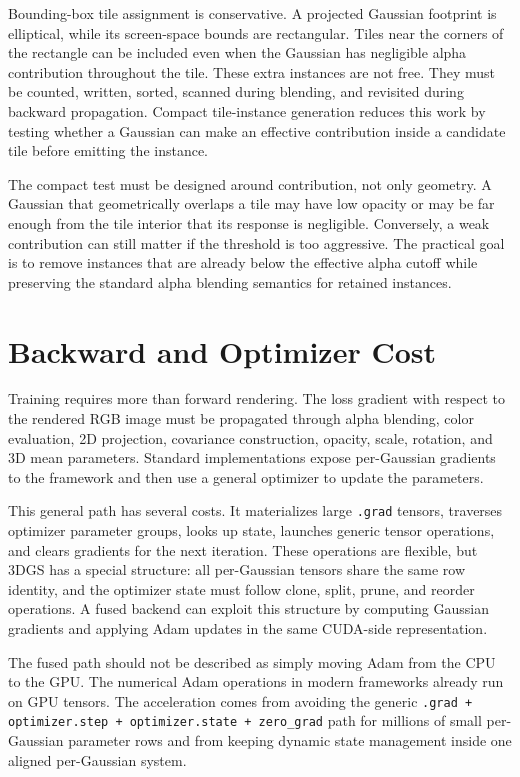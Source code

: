Bounding-box tile assignment is conservative. A projected Gaussian footprint is elliptical, while its screen-space bounds are rectangular. Tiles near the corners of the rectangle can be included even when the Gaussian has negligible alpha contribution throughout the tile. These extra instances are not free. They must be counted, written, sorted, scanned during blending, and revisited during backward propagation. Compact tile-instance generation reduces this work by testing whether a Gaussian can make an effective contribution inside a candidate tile before emitting the instance.

The compact test must be designed around contribution, not only geometry. A Gaussian that geometrically overlaps a tile may have low opacity or may be far enough from the tile interior that its response is negligible. Conversely, a weak contribution can still matter if the threshold is too aggressive. The practical goal is to remove instances that are already below the effective alpha cutoff while preserving the standard alpha blending semantics for retained instances.

\section{Backward and Optimizer Cost}

Training requires more than forward rendering. The loss gradient with respect to the rendered RGB image must be propagated through alpha blending, color evaluation, 2D projection, covariance construction, opacity, scale, rotation, and 3D mean parameters. Standard implementations expose per-Gaussian gradients to the framework and then use a general optimizer to update the parameters.

This general path has several costs. It materializes large \texttt{.grad} tensors, traverses optimizer parameter groups, looks up state, launches generic tensor operations, and clears gradients for the next iteration. These operations are flexible, but 3DGS has a special structure: all per-Gaussian tensors share the same row identity, and the optimizer state must follow clone, split, prune, and reorder operations. A fused backend can exploit this structure by computing Gaussian gradients and applying Adam updates in the same CUDA-side representation.

The fused path should not be described as simply moving Adam from the CPU to the GPU. The numerical Adam operations in modern frameworks already run on GPU tensors. The acceleration comes from avoiding the generic \texttt{.grad + optimizer.step + optimizer.state + zero\_grad} path for millions of small per-Gaussian parameter rows and from keeping dynamic state management inside one aligned per-Gaussian system.

